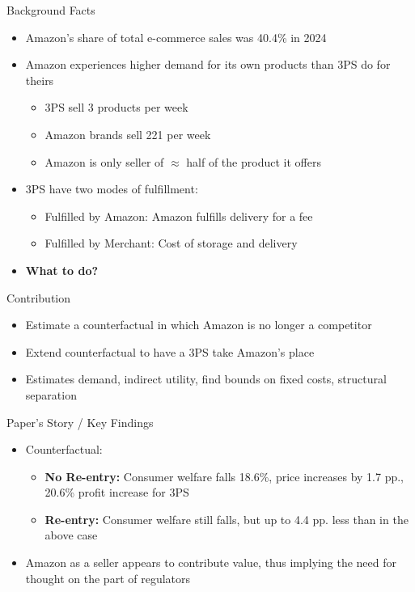 \documentclass[aspectratio=169,professionalfonts]{beamer}
\newcommand{\hl}[1]{\textbf{\textcolor{UGARed}{#1}}}
\newcommand{\hl}[1]{\textbf{\color{UGARed}{#1}}}
\begin{document}
\begin{frame}{Background Facts}
  \begin{itemize}
    \item Amazon's share of total e-commerce sales was 40.4\% in 2024
    \item Amazon experiences higher demand for its own products than 3PS do for theirs
    \begin{itemize}
      \item 3PS sell 3 products per week
      \item Amazon brands sell 221 per week
      \item Amazon is only seller of $\approx$ half of the product it offers
    \end{itemize}
    \item 3PS have two modes of fulfillment:
    \begin{itemize}
      \item Fulfilled by Amazon: Amazon fulfills delivery for a fee
      \item Fulfilled by Merchant: Cost of storage and delivery
    \end{itemize}
    \item \hl{What to do?}
  \end{itemize}
\end{frame}

\begin{frame}{Contribution}
  \begin{itemize}
    \item Estimate a counterfactual in which Amazon is no longer a competitor
    \item Extend counterfactual to have a 3PS take Amazon's place
    \item Estimates demand, indirect utility, find bounds on fixed costs, structural separation
  \end{itemize}
\end{frame}

\begin{frame}{Paper’s Story / Key Findings}
  \begin{itemize}
    \item Counterfactual:
    \begin{itemize}
      \item \hl{No Re-entry:} Consumer welfare falls 18.6\%, price increases by 1.7 pp., 20.6\% profit increase for 3PS
      \item \hl{Re-entry:} Consumer welfare still falls, but up to 4.4 pp. less than in the above case
    \end{itemize}
    \item Amazon as a seller appears to contribute value, thus implying the need for thought on the part of regulators
  \end{itemize}
\end{frame}
\end{document}
